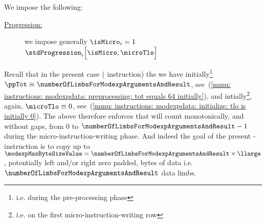 \begin{center} 
\end{center}
We impose the following:
\begin{description}
	\item[\underline{Progression:}] \label{mmu: instructions: modexpdata: micro instruction writing: tlo progression}
		we impose generally \If $\isMicro_{i} = 1$ \Then $\stdProgression_{i}\Big[\isMicro, \microTlo \Big]$
\end{description}
\saNote{} \label{mmu: modexData: microTLO explanation}
Recall that in the present case (\mmuInstFlagModexpData{} instruction) the we have
initially\footnote{i.e. during the pre-processing phase} $\ppTot \equiv \numberOfLimbsForModexpArgumentsAndResult$,
see~(\ref{mmu: instructions: modexpdata: preprocessing: tot equals 64 initially}),
and intially\footnote{i.e. on the first micro-instruction-writing row}, again, $\microTlo \equiv 0$,
see~(\ref{mmu: instructions: modexpdata: initialize: tlo is initially 0}).
The above therefore enforces that \microTlo{} will count monotonically,
and without gaps, from $0$ to $\numberOfLimbsForModexpArgumentsAndResult - 1$
during the micro-instruction-writing phase.
And indeed the goal of the present \mmuMod{}-instruction is to copy up to
$\modexpMaxByteSizeValue = \numberOfLimbsForModexpArgumentsAndResult \times \llarge$,
potentially left and/or right zero padded, bytes of data i.e. $\numberOfLimbsForModexpArgumentsAndResult$ data limbs.
